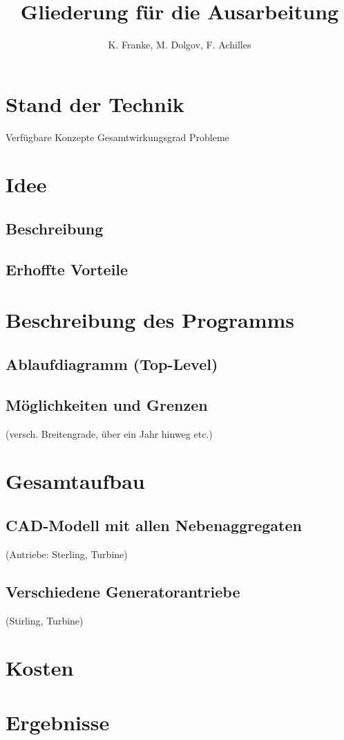 \documentclass[fontsize=10pt,paper=a4,bibliography=totoc]{scrartcl}
\title{Gliederung für die Ausarbeitung}
\author{K. Franke, M. Dolgov, F. Achilles}
\begin{document}
\maketitle

\section{Stand der Technik}
Verfügbare Konzepte
Gesamtwirkungsgrad
Probleme

\section{Idee}
\subsection{Beschreibung}
\subsection{Erhoffte Vorteile}

\section{Beschreibung des Programms}
\subsection{Ablaufdiagramm (Top-Level)}
\subsection{Möglichkeiten und Grenzen}
 (versch. Breitengrade, über ein Jahr hinweg etc.)
\section{Gesamtaufbau}
\subsection{CAD-Modell mit allen Nebenaggregaten}
 (Antriebe: Sterling, Turbine)
\subsection{Verschiedene Generatorantriebe}
 (Stirling, Turbine)
\section{Kosten}
\section{Ergebnisse}
\end{document}
